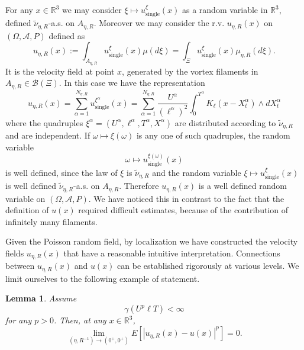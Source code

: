 \documentclass[a4paper,12pt]{article}
\newtheorem{lemma}{Lemma}
\begin{document}
For any $x\in\mathbb{R}^{3}$ we may consider $\xi\mapsto u_{\text{single}%
}^{\xi}\left(  x\right)  $ as a random variable in $\mathbb{R}^{3}$, defined
$\widetilde{\mathcal{\nu}}_{\eta,R}$-a.s. on $A_{\eta,R}$. Moreover we may
consider the r.v. $u_{\eta,R}(x)$ on $\left(  \Omega,\mathcal{A},P\right)  $
defined as
\begin{equation}
u_{\eta,R}(x):=\int_{A_{\eta,R}}u_{\text{single}}^{\xi}\left(  x\right)
\mu(d\xi)=\int_{\Xi}u_{\text{single}}^{\xi}\left(  x\right)  \mu_{\eta,R}%
(d\xi).
\end{equation}
It is the velocity field at point $x$, generated by the vortex filaments in
$A_{\eta,R}\in\mathcal{B}\left(  \Xi\right)  $. In this case we have the
representation
\[
u_{\eta,R}(x)=\sum_{\alpha=1}^{N_{\eta,R}}u_{\text{single}}^{\xi^{\alpha}%
}\left(  x\right)  =\sum_{\alpha=1}^{N_{\eta,R}}\frac{U^{\alpha}}%
{(\ell^{\alpha})^{2}}\int_{0}^{T^{\alpha}}K_{\ell}(x-X_{t}^{\alpha})\wedge
dX_{t}^{\alpha}%
\]
where the quadruples $\xi^{\alpha}=(U^{\alpha},\ell^{\alpha},T^{\alpha
},X^{\alpha})$ are distributed according to $\widetilde{\nu}_{\eta,R}$ and are
independent. If $\omega\mapsto\xi\left(  \omega\right)  $ is any one of such
quadruples, the random variable
\[
\omega\mapsto u_{\text{single}}^{\xi\left(  \omega\right)  }\left(  x\right)
\]
is well defined, since the law of $\xi$ is $\widetilde{\nu}_{\eta,R}$ and the
random variable $\xi\mapsto u_{\text{single}}^{\xi}\left(  x\right)  $ is well
defined $\widetilde{\mathcal{\nu}}_{\eta,R}$-a.s. on $A_{\eta,R}$. Therefore
$u_{\eta,R}(x)$ is a well defined random variable on $\left(  \Omega
,\mathcal{A},P\right)  $. We have noticed this in contrast to the fact that
the definition of $u(x)$ required difficult estimates, because of the
contribution of infinitely many filaments.

Given the Poisson random field, by localization we have constructed the
velocity fields $u_{\eta,R}(x)$ that have a reasonable intuitive
interpretation. Connections between $u_{\eta,R}(x)$ and $u(x)$ can be
established rigorously at various levels. We limit ourselves to the following
example of statement.

\begin{lemma}
Assume
\[
\gamma(U^{p}\ell T)<\infty
\]
for any $p>0$. Then, at any $x\in\mathbb{R}^{3}$,
\[
\lim_{\left(  \eta,R^{-1}\right)  \rightarrow\left(  0^{+},0^{+}\right)
}E\left[  \left|  u_{\eta,R}(x)-u(x)\right|  ^{p}\right]  =0.
\]
\end{lemma}
\end{document}
